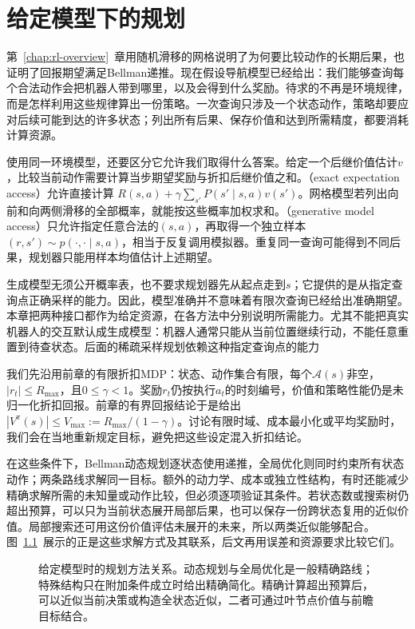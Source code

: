 \chapter{给定模型下的规划}
\label{chap:rl-planning}

第~\ref{chap:rl-overview}~章用随机滑移的网格说明了为何要比较动作的长期后果，也证明了回报期望满足Bellman递推。现在假设导航模型已经给出：我们能够查询每个合法动作会把机器人带到哪里，以及会得到什么奖励。待求的不再是环境规律，而是怎样利用这些规律算出一份策略。一次查询只涉及一个状态动作，策略却要应对后续可能到达的许多状态；列出所有后果、保存价值和达到所需精度，都要消耗计算资源。

使用同一环境模型，还要区分它允许我们取得什么答案。给定一个后继价值估计$v$，比较当前动作需要计算当步期望奖励与折扣后继价值之和。（exact expectation access）允许直接计算
$R(s,a)+\gamma\sum_{s'}P(s'\mid s,a)v(s')$。网格模型若列出向前和向两侧滑移的全部概率，就能按这些概率加权求和。（generative model access）只允许指定任意合法的$(s,a)$，再取得一个独立样本$(r,s')\sim p(\cdot,\cdot\mid s,a)$，相当于反复调用模拟器。重复同一查询可能得到不同后果，规划器只能用样本均值估计上述期望。

生成模型无须公开概率表，也不要求规划器先从起点走到$s$；它提供的是从指定查询点正确采样的能力。因此，模型准确并不意味着有限次查询已经给出准确期望。本章把两种接口都作为给定资源，在各方法中分别说明所需能力。尤其不能把真实机器人的交互默认成生成模型：机器人通常只能从当前位置继续行动，不能任意重置到待查状态。后面的稀疏采样规划依赖这种指定查询点的能力

我们先沿用前章的有限折扣MDP：状态、动作集合有限，每个$\mathcal A(s)$非空，$|r_t|\leq R_{\max}$，且$0\leq\gamma<1$。奖励$r_t$仍按执行$a_t$的时刻编号，价值和策略性能仍是未归一化折扣回报。前章的有界回报结论于是给出$|V^\pi(s)|\leq V_{\max}:=R_{\max}/(1-\gamma)$。讨论有限时域、成本最小化或平均奖励时，我们会在当地重新规定目标，避免把这些设定混入折扣结论。

在这些条件下，Bellman动态规划逐状态使用递推，全局优化则同时约束所有状态动作；两条路线求解同一目标。额外的动力学、成本或独立性结构，有时还能减少精确求解所需的未知量或动作比较，但必须逐项验证其条件。若状态数或搜索树仍超出预算，可以只为当前状态展开局部后果，也可以保存一份跨状态复用的近似价值。局部搜索还可用这份价值评估未展开的未来，所以两类近似能够配合。图~\ref{fig:rl-planning-map}~展示的正是这些求解方式及其联系，后文再用误差和资源要求比较它们。

\begin{figure}[htbp]
  \centering
  
  \caption{给定模型时的规划方法关系。动态规划与全局优化是一般精确路线；特殊结构只在附加条件成立时给出精确简化。精确计算超出预算后，可以近似当前决策或构造全状态近似，二者可通过叶节点价值与前瞻目标结合。}
  \label{fig:rl-planning-map}
\end{figure}

